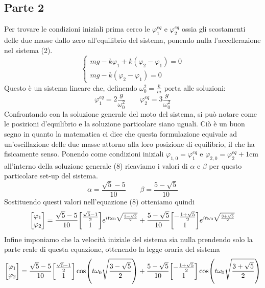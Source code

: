 \documentclass{scrartcl}
\renewcommand{\phi}{\varphi}
\begin{document}
    \subsection*{Parte 2}
    Per trovare le condizioni iniziali prima cerco le \(\phi_1^{eq}\) e \(\phi_2^{eq}\) ossia gli scostamenti delle due masse dallo zero all'equilibrio del sistema, ponendo nulla l'accellerazione nel sistema (2).
    \begin{equation}
        \begin{cases}
            mg - k\phi_1 + k(\phi_2-\phi_1) = 0 \\
            mg - k(\phi_2-\phi_1) = 0
        \end{cases}
    \end{equation}
    Questo è un sistema lineare che, definendo \(\omega_0^2 = \frac{k}{m}\) porta alle soluzioni:
    \[\phi_1^{eq} = 2\frac{g}{\omega_0^2} \qquad \phi_2^{eq} = 3\frac{g}{\omega_0^2}\]
    Confrontando con la soluzione generale del moto del sistema, si può notare come le posizioni d'equilibrio e la soluzione particolare siano uguali. 
    Ciò è un buon segno in quanto la matematica ci dice che questa formulazione equivale ad un'oscillazione delle due masse attorno alla loro posizione di equilibrio, il che ha fisicamente senso.
    Ponendo come condizioni iniziali \(\phi_{1, 0} = \phi_1^{eq}\) e \(\phi_{2, 0} = \phi_2^{eq} + 1 \text{cm}\) all'interno della soluzione generale (8) ricaviamo i valori di \(\alpha\) e \(\beta\) per questo particolare set-up del sistema.
    \[\alpha = \frac{\sqrt{5} - 5}{10} \qquad \beta = \frac{5 - \sqrt{5}}{10}\]
    Sostituendo questi valori nell'equazione (8) otteniamo quindi
    \begin{equation}
        \mqty[\phi_1 \\ \phi_2] = \frac{\sqrt{5}-5}{10} \mqty[\frac{\sqrt{5}-1}{2} \\ 1] e^{it\omega_0\sqrt{\frac{3-\sqrt{5}}{2}}} + \frac{5-\sqrt{5}}{10} \mqty[-\frac{1+\sqrt{5}}{2} \\ 1] e^{it\omega_0\sqrt{\frac{3+\sqrt{5}}{2}}}
    \end{equation}
    Infine imponiamo che la velocità iniziale del sistema sia nulla prendendo solo la parte reale di questa equazione, ottenendo la legge oraria del sistema 
    \begin{equation}
        \mqty[\phi_1 \\ \phi_2] = \frac{\sqrt{5}-5}{10} \mqty[\frac{\sqrt{5}-1}{2} \\ 1] \cos({t\omega_0\sqrt{\frac{3-\sqrt{5}}{2}}}) + \frac{5-\sqrt{5}}{10} \mqty[-\frac{1+\sqrt{5}}{2} \\ 1] \cos({t\omega_0\sqrt{\frac{3+\sqrt{5}}{2}}})
    \end{equation}
\end{document}
